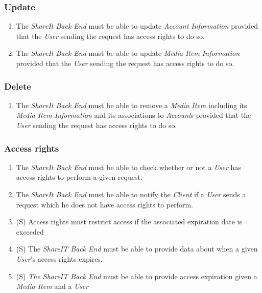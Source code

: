 \subsubsection{Update}
\begin{enumerate}[label=\textbf{FR-\twodigits*},resume]

\item The \textit{ShareIt Back End} must be able to update \textit{Account Information} provided that the \textit{User} sending the request has access rights to do so.

\item The \textit{ShareIt Back End} must be able to update \textit{Media Item Information} provided that the \textit{User} sending the request has access rights to do so.
\end{enumerate}

\subsubsection{Delete}
\begin{enumerate}[label=\textbf{FR-\twodigits*},resume]

\item The \textit{ShareIt Back End} must be able to remove a \textit{Media Item} including its \textit{Media Item Information} and its associations to \textit{Account}s provided that the \textit{User} sending the request has access rights to do so.

\end{enumerate}

\subsubsection{Access rights}
\begin{enumerate}[label=\textbf{FR-\twodigits*},resume]

\item The \textit{ShareIt Back End} must be able to check whether or not a \textit{User} has access rights to perform a given request.

\item The \textit{ShareIt Back End} must be able to notify the \textit{Client} if a \textit{User} sends a request which he does not have access rights to perform.

\item (S) Access rights must restrict access if the associated expiration date is exceeded

\item (S) The \textit{ShareIT Back End} must be able to provide data about when a given \textit{User}'s access rights expires.

\item (S) \textit{The ShareIT Back End} must be able to provide access expiration given a \textit{Media Item} and a \textit{User}

\end{enumerate}

%